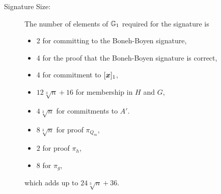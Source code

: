 
\begin{description}
\item[Signature Size:] The number of elements of $\mathbb{G}_1$ required  for the signature is
\begin{itemize}
\item 2 for committing to the Boneh-Boyen signature,
\item 4 for the proof that the Boneh-Boyen signature is correct,
\item 4 for commitment to $[{\boldsymbol{x}}]_1$,
\item $12\sqrt[3]{n} + 16$ for membership in $H$ and $G$,
\item $4\sqrt[3]{n}$ for commitments to $A'$.
\item $8\sqrt[3]{n}$ for proof  $\pi_{Q_m}$,
\item $2$ for proof $\pi_h$,
\item $8$ for $\pi_g$,
\end{itemize}
which adds up to $24\sqrt[3]{n} + 36$.


\end{description}
